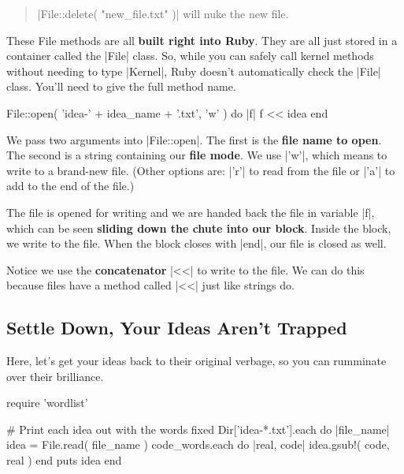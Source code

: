 \documentclass[12pt,twoside]{report}
\begin{document}
\begin{quote}
\rubyinline|File::delete( "new_file.txt" )| will nuke
the new file.\end{quote}


These File methods are all {\bf built right into Ruby}.  They are all
just stored in a container called the
\rubyinline|File| class.  So, while you can safely
call kernel methods without needing to type
\rubyinline|Kernel|, Ruby doesn't automatically check
the \rubyinline|File| class. You'll need to give the
full method name.


\begin{rubycode}

 File::open( 'idea-' + idea_name + '.txt', 'w' ) do |f|
   f << idea
 end

\end{rubycode}

We pass two arguments into \rubyinline|File::open|.
The first is the {\bf file name to open}.  The second is a string
containing our {\bf file mode}.  We use
\rubyinline|'w'|, which means to write to a brand-new
file.  (Other options are: \rubyinline|'r'| to read
from the file or \rubyinline|'a'| to add to the end of
the file.)

The file is opened for writing and we are handed back the file in
variable \rubyinline|f|, which can be seen {\bf
  sliding down the chute into our block}.  Inside the block, we write
to the file.  When the block closes with
\rubyinline|end|, our file is closed as well.

Notice we use the {\bf concatenator} \rubyinline|<<|
to write to the file.  We can do this because files have a method
called \rubyinline|<<| just like strings do.



\subsection{Settle Down, Your Ideas Aren't Trapped}



Here, let's get your ideas back to their original verbage, so you can
rumminate over their brilliance.


\begin{rubycode}

 require 'wordlist'

 # Print each idea out with the words fixed
 Dir['idea-*.txt'].each do |file_name|
   idea = File.read( file_name )
   code_words.each do |real, code|
     idea.gsub!( code, real )
   end
   puts idea
 end

\end{rubycode}
\end{document}

